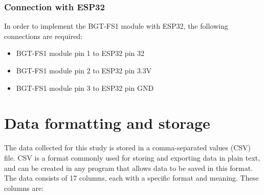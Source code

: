 \documentclass{report}
\begin{document}
\subsubsection{Connection with ESP32}
In order to implement the BGT-FS1 module with ESP32, the following connections are required:
\begin{itemize}
    \item BGT-FS1 module pin 1 to ESP32 pin 32
    \item BGT-FS1 module pin 2 to ESP32 pin 3.3V
    \item BGT-FS1 module pin 3 to ESP32 pin GND
\end{itemize}

\section{Data formatting and storage}

The data collected for this study is stored in a comma-separated values (CSV) file. CSV is a format commonly used for storing and exporting data in plain text, and can be created in any program that allows data to be saved in this format.\hfill \break 
\\
The data consists of 17 columns, each with a specific format and meaning. These columns are:
\end{document}
